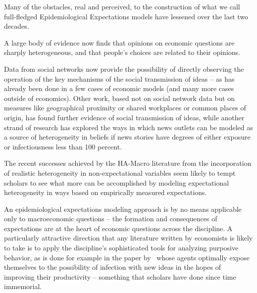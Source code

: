 
\label{conclusion}%

Many of the obstacles, real and perceived, to the construction of what we call full-fledged Epidemiological Expectations models have lessened over the last two decades.

A large body of evidence now finds that opinions on economic questions are sharply heterogeneous, and that people's choices are related to their opinions.

Data from social networks now provide the possibility of directly observing the operation of the key mechanisms of the social transmission of ideas -- as  has already been done in a few cases of economic models (and many more cases outside of economics).  Other work, based not on social network data but on measures like geographical proximity or shared workplaces or common places of origin, has found further evidence of social transmission of ideas, while another strand of research has explored the ways in which news outlets can be modeled as a source of heterogeneity in beliefs if news stories have degrees of either exposure or infectiousness less than 100 percent.

The recent successes achieved by the HA-Macro literature from the incorporation of realistic heterogeneity in non-expectational variables seem likely to tempt scholars to see what more can be accomplished by modeling expectational heterogeneity in ways based on empirically measured expectations.%

An epidemiological expectations modeling approach is by no means applicable only to macroeconomic questions -- the formation and consequences of expectations are at the heart of economic questions across the discipline.  A particularly attractive direction that any literature written by economists is likely to take is to apply the discipline's sophisticated tools for analyzing purposive behavior, as is done for example in the paper by~\cite{lucas2014knowledge} whose agents optimally expose themselves to the possibility of infection with new ideas in the hopes of improving their productivity -- something that scholars have done since time immemorial.


